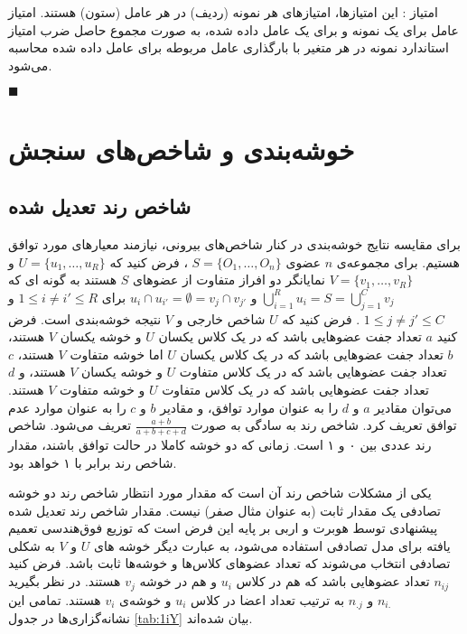 امتیاز 
: این امتیازها، امتیازهای هر نمونه (ردیف) در هر عامل (ستون) هستند. امتیاز عامل برای یک نمونه و برای یک عامل داده شده، به صورت مجموع حاصل ضرب  امتیاز استاندارد نمونه در هر متغیر با بارگذاری عامل مربوطه برای عامل داده شده محاسبه می‌شود.
\cite{site_pca}

$\blacksquare$

\section{
خوشه‌بندی و شاخص‌های سنجش
‌}
\subsection{
شاخص رند تعدیل شده
}

برای مقایسه نتایج خوشه‌بندی در کنار شاخص‌های بیرونی، نیازمند معیارهای مورد توافق هستیم.
برای مجموعه‌ی 
$n$
 عضوی 
$S = \{O_1, \ldots, O_n\}$
، فرض کنید که
$U = \{u_1, \ldots, u_R\}$
 و
$V = \{v_1, \ldots, v_R\}$
 نمایانگر دو افراز متفاوت از عضوهای $S$  هستند ‌به گونه ای که 
$\bigcup_{i=1}^R u_i = S = \bigcup_{j=1}^C v_j$
 و 
$u_i \cap u_{i'} = \emptyset = v_j \cap v_{j'}$
برای 
$1 \leq i \neq i' \leq R$
و 
$1 \leq j \neq j' \leq C$
. فرض کنید که $U$ شاخص خارجی و $V$ نتیجه خوشه‌بندی است. فرض کنید $a$ تعداد جفت عضوهایی باشد که در یک کلاس یکسان $U$ و خوشه یکسان $V$ هستند، $b$ تعداد جفت عضوهایی باشد که در یک کلاس یکسان $U$ اما خوشه متفاوت $V$ هستند، $c$ تعداد جفت عضوهایی باشد که در یک کلاس متفاوت $U$ و خوشه یکسان $V$ هستند، و $d$ تعداد جفت عضوهایی باشد که در یک کلاس متفاوت $U$ و خوشه متفاوت $V$ هستند. می‌توان مقادیر $a$ و $d$ را به عنوان موارد توافق، و مقادیر $b$ و $c$ را به عنوان موارد عدم توافق تعریف کرد. شاخص رند%
\cite{rand1971objective}
به سادگی به صورت 
$\frac{a+b}{a+b+c+d}$
 تعریف می‌شود. شاخص رند عددی بین ۰ و ۱ است. زمانی که دو خوشه کاملا در حالت توافق باشند، مقدار شاخص رند برابر با ۱ خواهد بود.

یکی از مشکلات شاخص رند آن است که مقدار مورد انتظار شاخص رند دو خوشه تصادفی یک مقدار ثابت (به عنوان مثال صفر) نیست. مقدار شاخص رند تعدیل شده%
 پیشنهادی توسط هوبرت و اربی%
\cite{hubert1985comparing}
 بر پایه این فرض است که توزیع فوق‌هندسی%
 تعمیم یافته برای مدل تصادفی استفاده می‌شود، به عبارت دیگر خوشه های $U$ و $V$ به شکلی تصادفی انتخاب می‌شوند که تعداد عضوهای کلاس‌ها و خوشه‌ها ثابت باشد. فرض کنید 
$n_{ij}$
 تعداد عضوهایی باشد که هم در کلاس 
$u_i$
 و هم در خوشه 
$v_j$
 هستند. در نظر بگیرید 
$n_{i.}$
 و 
$n_{.j}$ 
به ترتیب تعداد اعضا در کلاس
$u_i$
و خوشه‌ی
$v_i$
هستند. تمامی این نشانه‌گزاری‌ها در جدول
\autoref{tab:1iY}
بیان شده‌اند.

